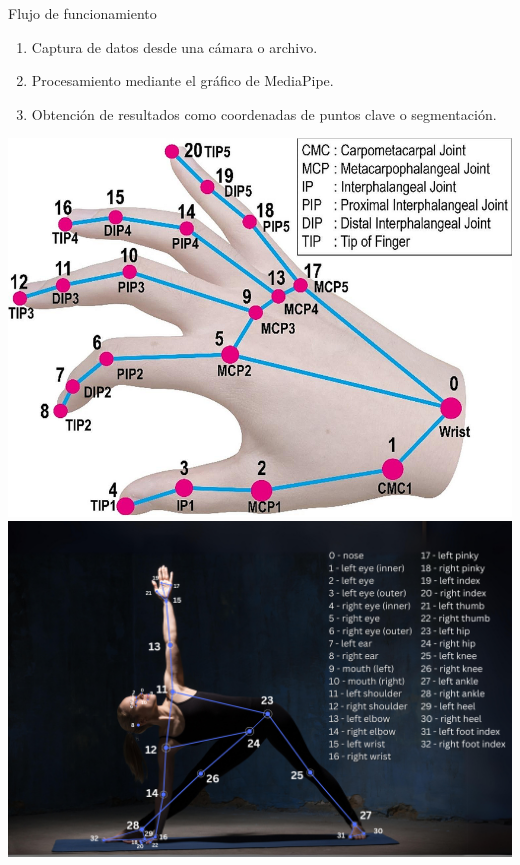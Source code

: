 \begin{frame}{Flujo de funcionamiento}
    \begin{enumerate}
        \item Captura de datos desde una cámara o archivo.
        \item Procesamiento mediante el gráfico de MediaPipe.
        \item Obtención de resultados como coordenadas de puntos clave o segmentación.
    \end{enumerate}
    \begin{center}
        \includegraphics[width=0.6\linewidth]{01_MediaPipe/hand_landmarks.png}
        \includegraphics[width=0.6\linewidth]{01_MediaPipe/pose_landmarks.png}
    \end{center}
\end{frame}

